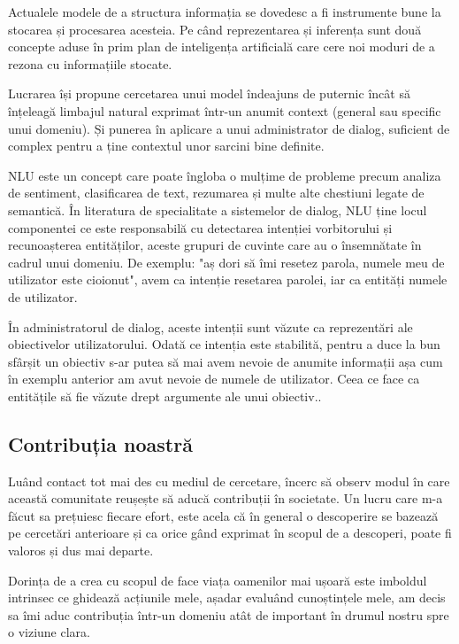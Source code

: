 Actualele modele de a structura informația se dovedesc a fi instrumente bune la stocarea și procesarea acesteia. Pe când reprezentarea și inferența sunt două concepte aduse în prim plan de inteligența artificială care cere noi moduri de a rezona cu informațiile stocate.

Lucrarea își propune cercetarea unui model îndeajuns de puternic încât să înțeleagă limbajul natural exprimat într-un anumit context (general sau specific unui domeniu). Și punerea în aplicare a unui administrator de dialog, suficient de complex pentru a ține contextul unor sarcini bine definite.

NLU este un concept care poate îngloba o mulțime de probleme precum analiza de sentiment, clasificarea de text, rezumarea și multe alte chestiuni legate de semantică. În literatura de specialitate a sistemelor de dialog, NLU ține locul componentei ce este responsabilă cu detectarea intenției vorbitorului și recunoașterea entităților, aceste grupuri de cuvinte care au o însemnătate în cadrul unui domeniu.
De exemplu: "aș dori să îmi resetez parola, numele meu de utilizator este cioionut", avem ca intenție resetarea parolei, iar ca entități numele de utilizator.

În administratorul de dialog, aceste intenții sunt văzute ca reprezentări ale obiectivelor utilizatorului. Odată ce intenția este stabilită, pentru a duce la bun sfârșit un obiectiv s-ar putea să mai avem nevoie de anumite informații așa cum în exemplu anterior am avut nevoie de numele de utilizator. Ceea ce face ca entitățile să fie văzute drept argumente ale unui obiectiv..


\subsection{Contribuția noastră}

Luând contact tot mai des cu mediul de cercetare, încerc să observ modul în care această comunitate reușește să aducă contribuții în societate. Un lucru care m-a făcut sa prețuiesc fiecare efort, este acela că în general o descoperire se bazează pe cercetări anterioare și ca orice gând exprimat în scopul de a descoperi, poate fi valoros și dus mai departe.

Dorința de a crea cu scopul de face viața oamenilor mai ușoară este imboldul intrinsec ce ghidează acțiunile mele, așadar evaluând cunoștințele mele, am decis sa îmi aduc contribuția într-un domeniu atât de important în drumul nostru spre o viziune clara.

